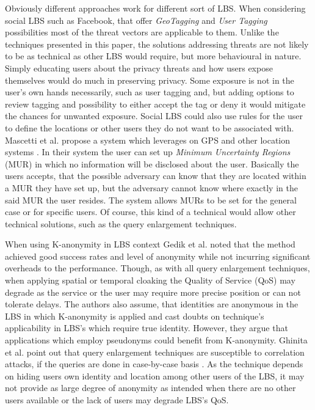 \documentclass[english]{tktltiki2}
\theoremstyle{definition}
\theoremstyle{remark}
\begin{document}
Obviously different approaches work for different sort of LBS. When considering social LBS such as Facebook, that offer \textit{GeoTagging} and \textit{User Tagging} possibilities most of the threat vectors are applicable to them. Unlike the techniques presented in this paper, the solutions addressing threats are not likely to be as technical as other LBS would require, but more behavioural in nature. Simply educating users about the privacy threats and how users expose themselves would do much in preserving privacy. Some exposure is not in the user's own hands necessarily, such as user tagging and, but adding options to review tagging and possibility to either accept the tag or deny it would mitigate the chances for unwanted exposure. Social LBS could also use rules for the user to define the locations  or other users they do not want to be associated with. Mascetti et al. propose a system which leverages on GPS and other location systems \cite{mascetti}. In their system the user can set up \textit{Minimum Uncertainty Regions} (MUR) in which no information will be disclosed about the user. Basically the users accepts, that the possible adversary can know that they are located within a MUR they have set up, but the adversary cannot know where exactly in the said MUR the user resides. The system allows MURs to be set for the general case or for specific users. Of course, this kind of a technical would allow other technical solutions, such as the query enlargement techniques. \par
When using K-anonymity in LBS context Gedik et al.\cite{Gedik2008} noted that the method achieved good success rates and level of anonymity while not incurring significant overheads to the performance. Though, as with all query enlargement techniques, when applying spatial or temporal cloaking the Quality of Service (QoS) may degrade as the service or the user may require more precise position or can not tolerate delays. The authors also assume, that identities are anonymous in the LBS in which K-anonymity is applied and cast doubts on technique's applicability in LBS's which require true identity. However, they argue that applications which employ pseudonyms could benefit from K-anonymity. Ghinita et al. point out that query enlargement techniques are susceptible  to correlation attacks, if the queries are done in case-by-case basis \cite{Ghinita2008}. As the technique depends on hiding users own identity and location among other users of the LBS, it may not provide as large degree of anonymity as intended when there are no other users available or the lack of users may degrade LBS's QoS. \par
\end{document}
